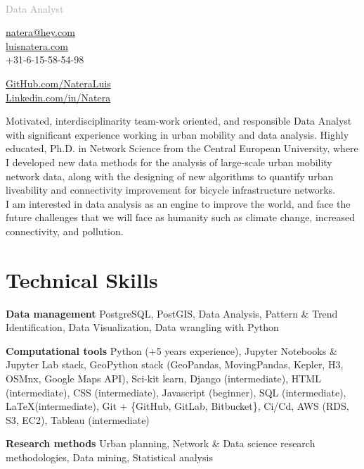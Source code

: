 \documentclass{academiccv}
\begin{document}
\raggedright

\namefont{\myname}\\
\vspace{1em}
\textcolor{darkgray}{{\Large Data Analyst}}

\vspace{1em}
\begin{minipage}[t]{0.495\textwidth}
  \href{mailto:natera@hey.com}{natera@hey.com}\\
  \href{https://luisnatera.com}{luisnatera.com} \\
  +31-6-15-58-54-98
\end{minipage}
\begin{minipage}[t]{0.495\textwidth}
	\href{https://github.com/nateraluis}{GitHub.com/NateraLuis}\\
	\href{https://www.linkedin.com/in/natera/}{Linkedin.com/in/Natera} \\
	
  \end{minipage}
\vspace{2.5em}

Motivated, interdisciplinarity team-work oriented, and responsible Data Analyst with significant experience working in urban mobility and data analysis. Highly educated, Ph.D. in Network Science from the Central European University, where I developed new data methods for the analysis of large-scale urban mobility network data, along with the designing of new algorithms to quantify urban liveability and connectivity improvement for bicycle infrastructure networks.\\
I am interested in data analysis as an engine to improve the world, and face the future challenges that we will face as humanity such as climate change, increased connectivity, and pollution.

\section*{Technical Skills}
\begin{list}{}{}
	\item[\textbf{Data management}] \tab PostgreSQL, PostGIS, Data Analysis, Pattern \& Trend Identification, Data Visualization, Data wrangling with Python 
	\item[\textbf{Computational tools}] \tab Python (+5 years experience), Jupyter Notebooks \& Jupyter Lab stack, GeoPython stack (GeoPandas, MovingPandas, Kepler, H3, OSMnx, Google Maps API), Sci-kit learn, Django (intermediate), HTML (intermediate), CSS (intermediate), Javascript (beginner), SQL (intermediate), \LaTeX (intermediate), Git + \{GitHub, GitLab, Bitbucket\}, Ci/Cd, AWS (RDS, S3, EC2), Tableau (intermediate) 
	\item[\textbf{Research methods}] \tab Urban planning, Network \& Data science research methodologies, Data mining, Statistical analysis
\end{list}
\end{document}
